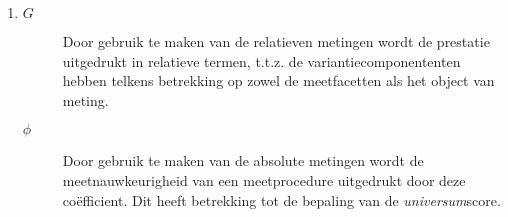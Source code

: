 {\begin{enumerate}
\begin{itemize}
	\item
	\begin{align}
		\phi =\dfrac{\sigma^2_{Obj~v.~met.}}{\sigma^2_{Obj~v.~met.}+ \sigma^2_{abs.~meting}} \label{eq.phi}
	\end{align}
	Houd voorts rekening met volgende niet te onderscheiden variantiecomponenten:~ \\
	$\bm{\hat{\sigma}^2_p},\bm{\hat{\sigma}^2_{dp}} , \bm{\hat{\sigma}^2_{kp}} \text{ en } \bm{\hat{\sigma}^2_{dkp, e}}$.\\
	We berekenen hiervoor eerst $\sigma^2_{abs.~meting}$
	\begin{align*}
		\sigma^2_{abs.~meting} 	&=  \dfrac{\hat{\sigma}^2_{k}}{n_k} + \dfrac{\hat{\sigma}^2_{p, kp, dp, dpk, e}}{n_p*n_k} \\
								&=  \dfrac{{3.122}}{3} + \dfrac{{1.2 + 1.3 +  615.8 +84.7}}{2*3}\\
								&=  1.0703 + 117.1667 &= 118.237
	\end{align*}
	Bijgevolg kan $\phi$ opgesteld worden door $\sigma^2_{abs. meting}$ en $\hat{\sigma}^2_{d}$ in te vullen in vergelijking \ref{eq.phi}:
	\begin{align*}
		\phi 	&=\dfrac{167.64}{167.64+  118.237}\\
				&=\dfrac{167.64}{285.877}=0.5864
	\end{align*}
	\end{itemize}
	\item \begin{description}
		\item[$G$] Door gebruik te maken van de relatieven metingen wordt de prestatie uitgedrukt in relatieve termen, t.t.z. de variantiecomponententen hebben telkens betrekking op zowel de meetfacetten als het object van meting. 
		\item[$\phi$] Door gebruik te maken van de absolute metingen wordt de meetnauwkeurigheid van een meetprocedure uitgedrukt door deze co\"efficient.
		Dit heeft betrekking tot de bepaling van de \emph{universum}score.
	\end{description}
	
\end{enumerate}
}
